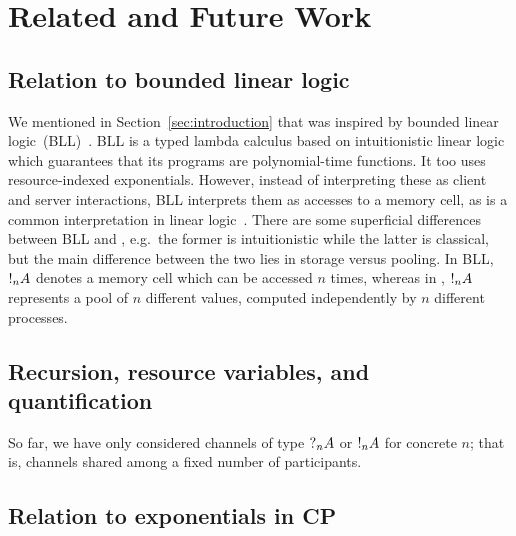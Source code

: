\documentclass[a4paper,UKenglish]{lipics-v2016}
\begin{document}
\section{Related and Future Work}
\label{sec:conclusion}

\subsection*{Relation to bounded linear logic}
We mentioned in Section~\ref{sec:introduction} that \nodcap was inspired by
bounded linear logic~(BLL)~\cite{girard1992}. BLL is a typed lambda calculus
based on intuitionistic linear logic which guarantees that its programs are
polynomial-time functions.
It too uses resource-indexed exponentials. However, instead of interpreting
these as client and server interactions, BLL interprets them as accesses to a
memory cell, as is a common interpretation in linear logic~\cite{girard1987}.
There are some superficial differences between BLL and \nodcap, e.g.\ the former
is intuitionistic while the latter is classical, but the main difference between
the two lies in storage versus pooling. In BLL, $\take[n]{A}$ denotes a memory
cell which can be accessed $n$ times, whereas in \nodcap, $\take[n]{A}$
represents a pool of $n$ different values, computed independently by $n$
different processes.

\subsection*{Recursion, resource variables, and quantification}

So far, we have only considered channels of type $\give[n]{A}$ or $\take[n]{A}$
for concrete $n$; that is, channels shared among a fixed number of participants.



\subsection*{Relation to exponentials in CP}
\end{document}
